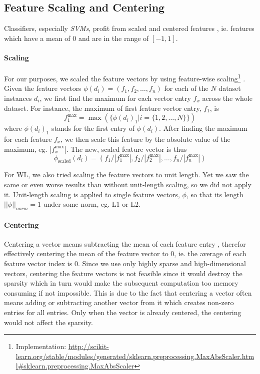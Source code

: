 \subsection{Feature Scaling and Centering}
Classifiers, especially \textit{SVMs}, profit from scaled and centered features \cite{Graf2001}, ie. features which have a mean of 0 and are in the range of $[-1, 1]$.

\paragraph{Scaling}
For our purposes, we scaled the feature vectors by using feature-wise scaling\footnote{Implementation: \url{http://scikit-learn.org/stable/modules/generated/sklearn.preprocessing.MaxAbsScaler.html\#sklearn.preprocessing.MaxAbsScaler}} \cite[p.~567]{Bishop2006}.
Given the feature vectors $\phi(d_i) = (f_1, f_2, \ldots, f_n)$ for each of the $N$ dataset instances $d_i$, we first find the maximum for each vector entry $f_x$ across the whole dataset. For instance, the maximum of first feature vector entry, $f_1$, is
\begin{equation*}
f_1^{\textrm{max}} = \max(\{\phi(d_i)_{1} | i = \{1, 2, \ldots, N\} \})
\end{equation*}
where $\phi(d_i)_{1}$ stands for the first entry of $\phi(d_i)$.
After finding the maximum for each feature $f_x$, we then scale this feature by the absolute value of the maximum, eg. $|f_x^{\textrm{max}}|$.
The new, scaled feature vector is thus
\begin{equation*}
\phi_{\textrm{scaled}}(d_i) = (f_1 / |f_1^{\textrm{max}}|, f_2 / |f_2^{\textrm{max}}|, \ldots, f_n / |f_n^{\textrm{max}}|)
\end{equation*}

For WL, we also tried scaling the feature vectors to unit length. Yet we saw the same or even worse results than without unit-length scaling, so we did not apply it.
Unit-length scaling is applied to single feature vectors, $\phi$, so that its length $||\phi||_{norm} = 1$ under some norm, eg. L1 or L2.

\paragraph{Centering}
Centering a vector means subtracting the mean of each feature entry  \cite[p.~567]{Bishop2006}, therefor effectively centering the mean of the feature vector to 0, ie. the average of each feature vector index is 0.
Since we use only highly sparse and high-dimensional vectors, centering the feature vectors is not feasible since it would destroy the sparsity which in turn would make the subsequent computation too memory consuming if not impossible.
This is due to the fact that centering a vector often means adding or subtracting another vector from it which creates non-zero entries for all entries.
Only when the vector is already centered, the centering would not affect the sparsity.

